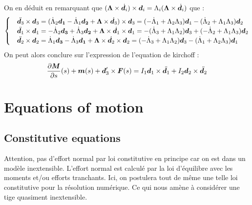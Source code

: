On en déduit en remarquant que $(\boldsymbol{\Lambda}\times\dot{\boldsymbol{d}_i})\times\boldsymbol{d}_i = \Lambda_i(\boldsymbol{\Lambda}\times\dot{\boldsymbol{d}_i})$ que :
\begin{equation}
\begin{cases}
&\ddot{\boldsymbol{d}_3}\times\boldsymbol{d}_3
			= (\dot{\Lambda}_2\boldsymbol{d_1} - \dot{\Lambda}_1\boldsymbol{d_2}
				+ \boldsymbol{\Lambda} \times \dot{\boldsymbol{d}_3}) \times \boldsymbol{d}_3
			= (- \dot{\Lambda}_1 + \Lambda_2\Lambda_3)\boldsymbol{d}_1
			-(\dot{\Lambda}_2 + \Lambda_1\Lambda_3)\boldsymbol{d}_2\\
&\ddot{\boldsymbol{d}_1}\times\boldsymbol{d}_1
			= -\dot{\Lambda}_2\boldsymbol{d_3} + \dot{\Lambda}_3\boldsymbol{d_2}
				+ \boldsymbol{\Lambda} \times \dot{\boldsymbol{d}_1} \times \boldsymbol{d}_1
			= -(\dot{\Lambda}_3 + \Lambda_1\Lambda_2)\boldsymbol{d}_3
			+(-\dot{\Lambda}_2 + \Lambda_1\Lambda_3)\boldsymbol{d}_2\\
&\ddot{\boldsymbol{d}_2} \times\boldsymbol{d}_2
			= \dot{\Lambda}_1\boldsymbol{d_3} - \dot{\Lambda}_3\boldsymbol{d_1}
				+ \boldsymbol{\Lambda} \times \dot{\boldsymbol{d}_2}  \times \boldsymbol{d}_2
			= (- \dot{\Lambda}_3 + \Lambda_1\Lambda_2)\boldsymbol{d}_3
			-(\dot{\Lambda}_1 + \Lambda_2\Lambda_3)\boldsymbol{d}_1\\
\end{cases}
\end{equation}
On peut alors conclure sur l'expression de l'equation de kirchoff :
\begin{equation}
	\frac{\partial \boldsymbol{M}}{\partial s}(s)+\boldsymbol{m}(s) + \boldsymbol{d}_3'\times \boldsymbol{F}(s) = I_1\boldsymbol{d}_1 \times \ddot{\boldsymbol{d}_1} + I_2 \boldsymbol{d}_2 \times \ddot{\boldsymbol{d}_2}
\end{equation}

\section{Equations of motion}
\subsection{Constitutive equations}

Attention, pas d'effort normal par loi constitutive en principe car on est dans un modèle inextensible.
L'effort normal est calculé par la loi d'équilibre avec les moments et/ou efforts tranchants.
Ici, on postulera tout de même une telle loi constitutive pour la résolution numérique. Ce qui nous amène à considérer une tige quasiment inextensible.


